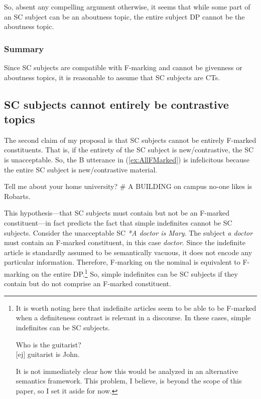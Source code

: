 \documentclass[
	letterpaper,
]{article}
\begin{document}
So, absent any compelling argument otherwise, it seems that while some part of an SC subject can be an aboutness topic, the entire subject DP cannot be the aboutness topic.

\subsubsection{Summary}
Since SC subjects are compatible with F-marking and cannot be givenness or aboutness topics, it is reasonable to assume that SC subjects are CTs.
\subsection{SC subjects cannot entirely be contrastive topics}
The second claim of my proposal is that SC subjects cannot be entirely F-marked constituents.
That is, if the entirety of the SC subject is new/contrastive, the SC is unacceptable.
So, the B utterance in (\ref{ex:AllFMarked}) is infelicitous because the entire SC subject is new/contrastive material.
\begin{exe}
\ex\label{ex:AllFMarked}
\begin{xlist}
	 Tell me about your home university?
	\# A BUILDING on campus no-one likes is Robarts.
\end{xlist}	
\end{exe}
This hypothesis---that SC subjects must contain but not be an F-marked constituent---in fact predicts the fact that simple indefinites cannot be SC subjects.
Consider the unacceptable SC \textit{*A doctor is Mary}.
The subject \textit{a doctor} must contain an F-marked constituent, in this case \textit{doctor}.
Since the indefinite article is standardly assumed to be semantically vacuous, it does not encode any particular information.
Therefore, F-marking on the nominal is equivalent to F-marking on the entire DP.\footnote{
It is worth noting here that indefinite articles seem to be able to be F-marked when a definiteness contrast is relevant in a discourse.
In these cases, simple indefinites can be SC subjects.
\begin{exe}
\ex Who is the guitarist?\\
$[$ej$]$ guitarist is John.	
\end{exe}

It is not immediately clear how this would be analyzed in an alternative semantics framework.
This problem, I believe, is beyond the scope of this paper, so I set it aside for now.
}
So, simple indefinites can be SC subjects if they contain but do not comprise an F-marked constituent.
\end{document}
